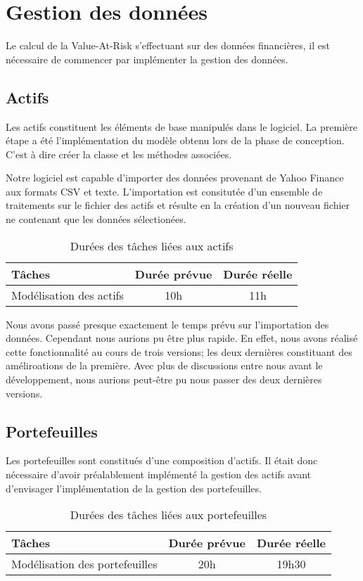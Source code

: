 \documentclass[a4paper]{report}
\begin{document}
\section{Gestion des données}
Le calcul de la Value-At-Risk s'effectuant sur des données financières, il est nécessaire de commencer par implémenter la gestion des données.

\subsection{Actifs}
Les actifs constituent les éléments de base manipulés dans le logiciel.
La première étape a été l'implémentation du modèle obtenu lors de la phase de conception.
C'est à dire créer la classe et les méthodes associées.

Notre logiciel est capable d'importer des données provenant de Yahoo Finance aux formats CSV et texte.
L'importation est consitutée d'un ensemble de traitements sur le fichier des actifs et résulte en la création d'un nouveau fichier ne contenant que les données sélectionées.

\begin{table}[H]
\centering
  \begin{tabularx}{0.8\textwidth}{| X | c | c |}
    \hline
	Tâches & Durée prévue & Durée réelle\\
    \hline
    Modélisation des actifs & 10h & 11h\\
    \hline
  \end{tabularx}
  \caption{Durées des tâches liées aux actifs}
\end{table}

Nous avons passé presque exactement le temps prévu sur l'importation des données.
Cependant nous aurions pu être plus rapide.
En effet, nous avons réalisé cette fonctionnalité au cours de trois versions; les deux dernières constituant des améliroations de la première.
Avec plus de discussions entre nous avant le développement, nous aurions peut-être pu nous passer des deux dernières versions.

\subsection{Portefeuilles}
Les portefeuilles sont constitués d'une composition d'actifs.
Il était donc nécessaire d'avoir préalablement implémenté la gestion des actifs avant d'envisager l'implémentation de la gestion des portefeuilles.

\begin{table}[H]
\centering
  \begin{tabularx}{0.8\textwidth}{| X | c | c |}
    \hline
	Tâches & Durée prévue & Durée réelle \\
    \hline
     Modélisation des portefeuilles &  20h & 19h30\\
    \hline
  \end{tabularx}
  \caption{Durées des tâches liées aux portefeuilles}
\end{table}
\end{document}
